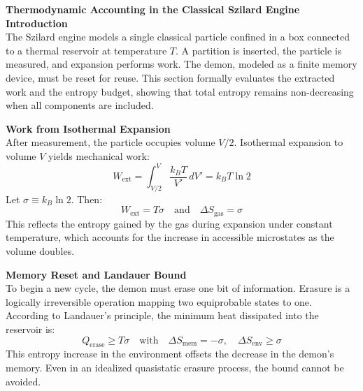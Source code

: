 \begin{technical}
{\Large\textbf{Thermodynamic Accounting in the Classical Szilard Engine}}\\[0.7em]

\noindent\textbf{Introduction}\\[0.5em]
The Szilard engine models a single classical particle confined in a box connected to a thermal reservoir at temperature \( T \). A partition is inserted, the particle is measured, and expansion performs work. The demon, modeled as a finite memory device, must be reset for reuse. This section formally evaluates the extracted work and the entropy budget, showing that total entropy remains non-decreasing when all components are included.

\vspace{0.5em}
\noindent\textbf{Work from Isothermal Expansion}\\[0.5em]
After measurement, the particle occupies volume \( V/2 \). Isothermal expansion to volume \( V \) yields mechanical work:
\[
W_{\text{ext}} = \int_{V/2}^{V} \frac{k_B T}{V'}\,dV' = k_B T \ln 2
\]
Let \( \sigma \equiv k_B \ln 2 \). Then:
\[
W_{\text{ext}} = T \sigma
\quad \text{and} \quad
\Delta S_{\text{gas}} = \sigma
\]
This reflects the entropy gained by the gas during expansion under constant temperature, which accounts for the increase in accessible microstates as the volume doubles.

\vspace{0.5em}
\noindent\textbf{Memory Reset and Landauer Bound}\\[0.5em]
To begin a new cycle, the demon must erase one bit of information. Erasure is a logically irreversible operation mapping two equiprobable states to one. According to Landauer's principle, the minimum heat dissipated into the reservoir is:
\[
Q_{\text{erase}} \geq T \sigma
\quad \text{with} \quad
\Delta S_{\text{mem}} = -\sigma, \quad
\Delta S_{\text{env}} \geq \sigma
\]
This entropy increase in the environment offsets the decrease in the demon’s memory. Even in an idealized quasistatic erasure process, the bound cannot be avoided.


\end{technical}
